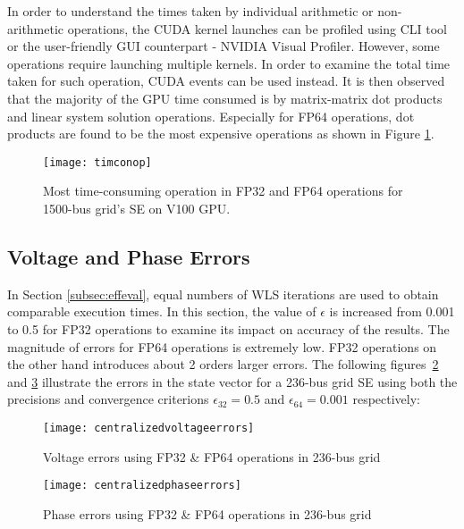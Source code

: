 \documentclass[thesis.tex]{subfiles}
\begin{document}
In order to understand the times taken by individual arithmetic or non-arithmetic operations, the CUDA kernel launches can be profiled using CLI tool  or the user-friendly GUI counterpart - NVIDIA Visual Profiler. However, some operations require launching multiple kernels. In order to examine the total time taken for such operation, CUDA events can be used instead. It is then observed that the majority of the GPU time consumed is by matrix-matrix dot products and linear system solution operations. Especially for FP64 operations, dot products are found to be the most expensive operations as shown in Figure \ref{fig:timconop}.
\begin{figure}[H]
	\centering
	\texttt{[image: timconop]}
	\caption{Most time-consuming operation in FP32 and FP64 operations for 1500-bus grid’s SE on V100 GPU.}
	\label{fig:timconop}
\end{figure}


\subsection{Voltage and Phase Errors}\label{subsec:volPhaErrors}
In Section \ref{subsec:effeval}, equal numbers of WLS iterations are used to obtain comparable execution times. In this section, the value of $\epsilon$ is increased from 0.001 to 0.5 for FP32 operations to examine its impact on accuracy of the results.
The magnitude of errors for FP64 operations is extremely low. FP32 operations on the other hand introduces about 2 orders larger errors. The following figures~\ref{fig:centralizedvoltageerrors} and \ref{fig:centralizedphaseerrors} illustrate the errors in the state vector for a 236-bus grid SE using both the precisions and convergence criterions $\epsilon_{32} = 0.5$ and $\epsilon_{64} = 0.001$ respectively:


\begin{figure}[H]
	\centering
	\texttt{[image: centralizedvoltageerrors]}
	\caption{Voltage errors using FP32 \& FP64 operations in 236-bus grid}
	\label{fig:centralizedvoltageerrors}
\end{figure}

\begin{figure}[H]
	\centering
	\texttt{[image: centralizedphaseerrors]}
	\caption{Phase errors using FP32 \& FP64 operations in 236-bus grid}
	\label{fig:centralizedphaseerrors}
\end{figure}
\end{document}
